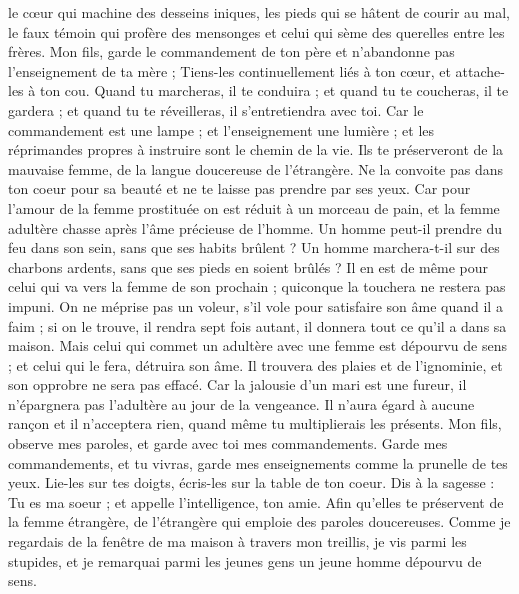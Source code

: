 \begin{multicols}{2}
le cœur qui machine des desseins iniques, les pieds qui se hâtent de courir au mal,
le faux témoin qui profère des mensonges et celui qui sème des querelles entre les frères.
Mon fils, garde le commandement de ton père et n'abandonne pas l'enseignement de ta mère ;
Tiens-les continuellement liés à ton cœur, et attache-les à ton cou.
Quand tu marcheras, il te conduira ; et quand tu te coucheras, il te gardera ; et quand tu te réveilleras, il s'entretiendra avec toi.
Car le commandement est une lampe ; et l'enseignement une lumière ; et les réprimandes propres à instruire sont le chemin de la vie.
Ils te préserveront de la mauvaise femme, de la langue doucereuse de l'étrangère.
Ne la convoite pas dans ton coeur pour sa beauté et ne te laisse pas prendre par ses yeux.
Car pour l'amour de la femme prostituée on est réduit à un morceau de pain, et la femme adultère chasse après l'âme précieuse de l'homme.
Un homme peut-il prendre du feu dans son sein, sans que ses habits brûlent ?
Un homme marchera-t-il sur des charbons ardents, sans que ses pieds en soient brûlés ?
Il en est de même pour celui qui va vers la femme de son prochain ; quiconque la touchera ne restera pas impuni.
On ne méprise pas un voleur, s'il vole pour satisfaire son âme quand il a faim ;
si on le trouve, il rendra sept fois autant, il donnera tout ce qu'il a dans sa maison.
Mais celui qui commet un adultère avec une femme est dépourvu de sens ; et celui qui le fera, détruira son âme.
Il trouvera des plaies et de l'ignominie, et son opprobre ne sera pas effacé.
Car la jalousie d'un mari est une fureur, il n'épargnera pas l'adultère au jour de la vengeance.
Il n'aura égard à aucune rançon et il n'acceptera rien, quand même tu multiplierais les présents.
\VerseOne{}Mon fils, observe mes paroles, et garde avec toi mes commandements.
Garde mes commandements, et tu vivras, garde mes enseignements comme la prunelle de tes yeux.
Lie-les sur tes doigts, écris-les sur la table de ton coeur.
Dis à la sagesse : Tu es ma soeur ; et appelle l'intelligence, ton amie.
Afin qu'elles te préservent de la femme étrangère, de l'étrangère qui emploie des paroles doucereuses.
Comme je regardais de la fenêtre de ma maison à travers mon treillis,
je vis parmi les stupides, et je remarquai parmi les jeunes gens un jeune homme dépourvu de sens.

\end{multicols}
